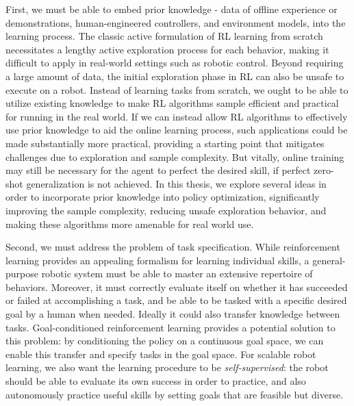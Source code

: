 First, we must be able to embed prior knowledge - data of offline experience or demonstrations, human-engineered controllers, and environment models, into the learning process.
The classic active formulation of RL learning from scratch necessitates a lengthy active exploration process for each behavior, making it difficult to apply in real-world settings such as robotic control.
Beyond requiring a large amount of data, the initial exploration phase in RL can also be unsafe to execute on a robot.
Instead of learning tasks from scratch, we ought to be able to utilize existing knowledge to make RL algorithms sample efficient and practical for running in the real world.
If we can instead allow RL algorithms to effectively use prior knowledge to aid the online learning process, such applications could be made substantially more practical, providing a starting point that mitigates challenges due to exploration and sample complexity.
But vitally, online training may still be necessary for the agent to perfect the desired skill, if perfect zero-shot generalization is not achieved.
In this thesis, we explore several ideas in order to incorporate prior knowledge into policy optimization, significantly improving the sample complexity, reducing unsafe exploration behavior, and making these algorithms more amenable for real world use.

Second, we must address the problem of task specification.
While reinforcement learning provides an appealing formalism for learning individual skills, a general-purpose robotic system must be able to master an extensive repertoire of behaviors.
Moreover, it must correctly evaluate itself on whether it has succeeded or failed at accomplishing a task, and be able to be tasked with a specific desired goal by a human when needed.
Ideally it could also transfer knowledge between tasks.
Goal-conditioned reinforcement learning provides a potential solution to this problem: by conditioning the policy on a continuous goal space, we can enable this transfer and specify tasks in the goal space.
For scalable robot learning, we also want the learning procedure to be \textit{self-supervised}: the robot should be able to evaluate its own success in order to practice, and also autonomously practice useful skills by setting goals that are feasible but diverse.

